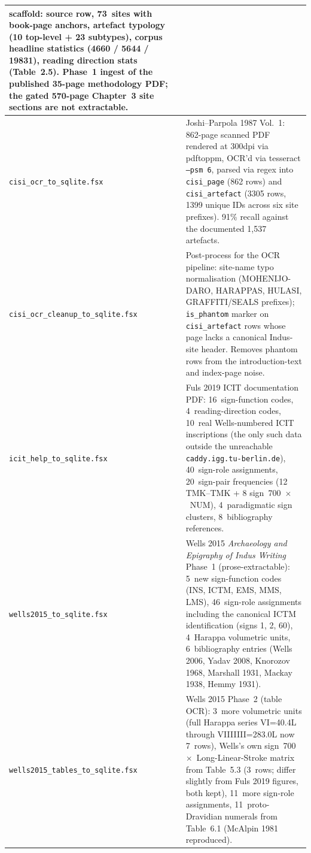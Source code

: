 \begin{longtable}{@{}lp{8cm}@{}}
    scaffold: source row, 73~sites with book-page anchors,
    artefact typology (10 top-level + 23 subtypes),
    corpus headline statistics (4660 / 5644 / 19831), reading
    direction stats (Table~2.5). Phase~1 ingest of the published
    35-page methodology PDF; the gated 570-page Chapter~3 site
    sections are not extractable. \\
\midrule
\texttt{cisi\_ocr\_to\_sqlite.fsx}
  & Joshi--Parpola 1987 Vol.~1: 862-page scanned PDF rendered at
    300dpi via pdftoppm, OCR'd via tesseract \texttt{--psm 6},
    parsed via regex into \texttt{cisi\_page} (862 rows) and
    \texttt{cisi\_artefact} (3305 rows, 1399 unique IDs across
    six site prefixes). 91\% recall against the documented
    1{,}537 artefacts. \\
\midrule
\texttt{cisi\_ocr\_cleanup\_to\_sqlite.fsx}
  & Post-process for the OCR pipeline: site-name typo
    normalisation (MOHENIJO-DARO, HARAPPAS, HULASI, GRAFFITI/SEALS
    prefixes); \texttt{is\_phantom} marker on
    \texttt{cisi\_artefact} rows whose page lacks a canonical
    Indus-site header. Removes phantom rows from the
    introduction-text and index-page noise. \\
\midrule
\texttt{icit\_help\_to\_sqlite.fsx}
  & Fuls 2019 ICIT documentation PDF: 16~sign-function codes,
    4~reading-direction codes, 10~real Wells-numbered ICIT
    inscriptions (the only such data outside the unreachable
    \texttt{caddy.igg.tu-berlin.de}), 40~sign-role assignments,
    20~sign-pair frequencies (12 TMK--TMK + 8 sign~700~$\times$~NUM),
    4~paradigmatic sign clusters, 8~bibliography references. \\
\midrule
\texttt{wells2015\_to\_sqlite.fsx}
  & Wells 2015 \textit{Archaeology and Epigraphy of Indus
    Writing} Phase~1 (prose-extractable): 5~new sign-function
    codes (INS, ICTM, EMS, MMS, LMS), 46~sign-role assignments
    including the canonical ICTM identification (signs 1, 2, 60),
    4~Harappa volumetric units, 6~bibliography entries
    (Wells 2006, Yadav 2008, Knorozov 1968, Marshall 1931,
    Mackay 1938, Hemmy 1931). \\
\midrule
\texttt{wells2015\_tables\_to\_sqlite.fsx}
  & Wells 2015 Phase~2 (table OCR): 3~more volumetric units
    (full Harappa series VI=40.4L through VIIIIIII=283.0L now
    7~rows), Wells's own sign~700~$\times$~Long-Linear-Stroke
    matrix from Table~5.3 (3~rows; differ slightly from Fuls
    2019 figures, both kept), 11~more sign-role assignments,
    11~proto-Dravidian numerals from Table~6.1 (McAlpin 1981
    reproduced). \\
\end{longtable}

